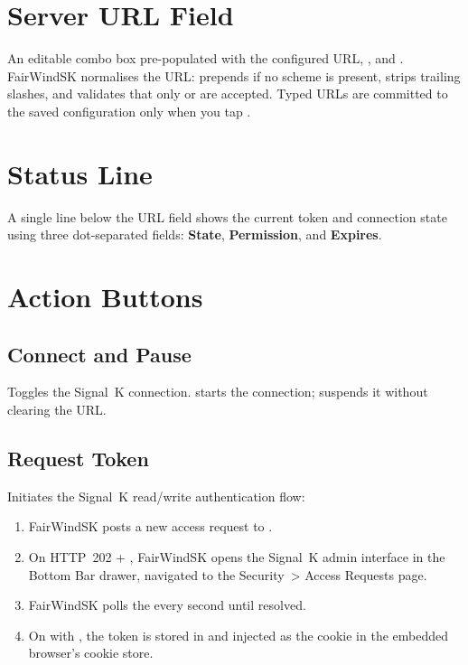 \section{Server URL Field}

An editable combo box pre-populated with the configured URL, ,
and .
FairWindSK normalises the URL: prepends  if no scheme is present,
strips trailing slashes, and validates that only  or  are accepted.
Typed URLs are committed to the saved configuration only when you tap .

\section{Status Line}

A single line below the URL field shows the current token and connection state using
three dot-separated fields: \textbf{State}, \textbf{Permission}, and \textbf{Expires}.

\section{Action Buttons}

\subsection{Connect and Pause}

Toggles the Signal~K connection.
 starts the connection;  suspends it without clearing the URL.

\subsection{Request Token}

Initiates the Signal~K read/write authentication flow:

\begin{enumerate}
  \item FairWindSK posts a new access request to .
  \item On HTTP~202 + , FairWindSK opens the Signal~K admin interface in the
        Bottom Bar drawer, navigated to the Security~> Access Requests page.
  \item FairWindSK polls the  every second until resolved.
  \item On  with , the token is stored in
         and injected as the  cookie in the
        embedded browser's cookie store.
\end{enumerate}

